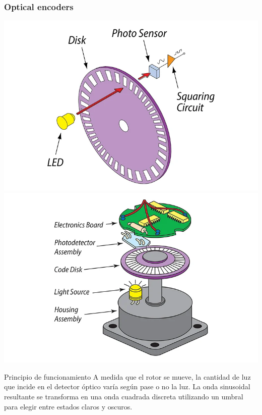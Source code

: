 \begin{frame}
    \frametitle{Optical encoders}
    \scriptsize
    \includegraphics[width=0.45\columnwidth]{images/encoder_principle}
    \includegraphics[width=0.46\columnwidth]{images/encoder_parts}
    \footnotesize

    \begin{block}{Principio de funcionamiento}
        A medida que el rotor se mueve, la cantidad de luz que incide en el detector óptico varía según pase o no la luz. La onda sinusoidal resultante se transforma en una onda cuadrada discreta utilizando un umbral para elegir entre estados claros y oscuros. %
    \end{block}
\end{frame}

